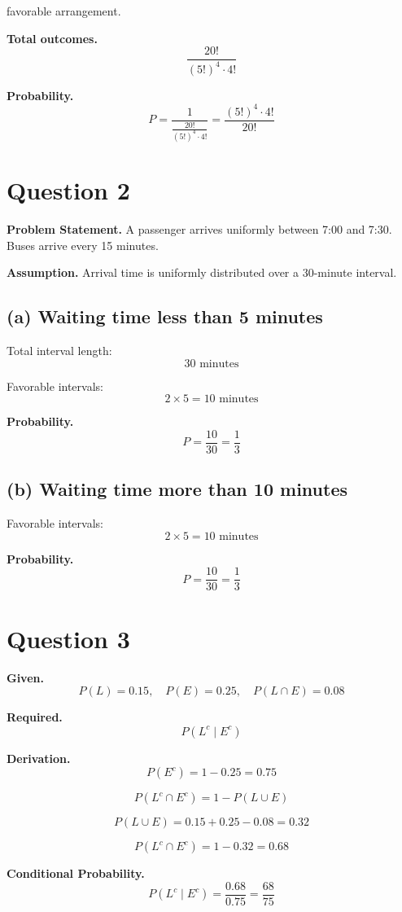 \documentclass[12pt]{article}
\begin{document}
favorable arrangement.

\textbf{Total outcomes.}
\[
\frac{20!}{(5!)^4 \cdot 4!}
\]

\textbf{Probability.}
\[
P = \frac{1}{\frac{20!}{(5!)^4 \cdot 4!}} = \frac{(5!)^4 \cdot 4!}{20!}
\]

\section*{Question 2}

\textbf{Problem Statement.}  
A passenger arrives uniformly between 7:00 and 7:30. Buses arrive every 15 minutes.

\textbf{Assumption.}
Arrival time is uniformly distributed over a 30-minute interval.

\subsection*{(a) Waiting time less than 5 minutes}

Total interval length:
\[
30 \text{ minutes}
\]

Favorable intervals:
\[
2 \times 5 = 10 \text{ minutes}
\]

\textbf{Probability.}
\[
P = \frac{10}{30} = \frac{1}{3}
\]

\subsection*{(b) Waiting time more than 10 minutes}

Favorable intervals:
\[
2 \times 5 = 10 \text{ minutes}
\]

\textbf{Probability.}
\[
P = \frac{10}{30} = \frac{1}{3}
\]

\section*{Question 3}

\textbf{Given.}
\[
P(L) = 0.15, \quad P(E) = 0.25, \quad P(L \cap E) = 0.08
\]

\textbf{Required.}
\[
P(L^c \mid E^c)
\]

\textbf{Derivation.}
\[
P(E^c) = 1 - 0.25 = 0.75
\]

\[
P(L^c \cap E^c) = 1 - P(L \cup E)
\]

\[
P(L \cup E) = 0.15 + 0.25 - 0.08 = 0.32
\]

\[
P(L^c \cap E^c) = 1 - 0.32 = 0.68
\]

\textbf{Conditional Probability.}
\[
P(L^c \mid E^c) = \frac{0.68}{0.75} = \frac{68}{75}
\]
\end{document}
